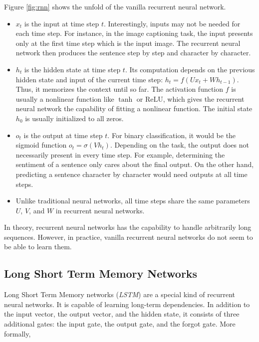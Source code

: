         Figure \ref{fig:rnn} shows the unfold of the vanilla recurrent neural network.

        \begin{itemize}
            \item $x_t$ is the input at time step $t$.
                Interestingly, inputs may not be needed for each time step.
                For instance, in the image captioning task,
                the input presents only at the first time step which is the input image.
                The recurrent neural network then produces the sentence step by step and character by character.
            \item $h_t$ is the hidden state at time step $t$.
                Its computation depends on the previous hidden state and input of the current time step:
                $h_t = f(Ux_t + Wh_{t-1})$.
                Thus, it memorizes the context until so far.
                The activation function $f$ is usually a nonlinear function like $\tanh$ or $\mathrm{ReLU}$,
                which gives the recurrent neural network the capability of fitting a nonlinear function.
                The initial state $h_0$ is usually initialized to all zeros.
            \item $o_t$ is the output at time step $t$.
                For binary classification, it would be the sigmoid function $o_t = \sigma(Vh_t)$.
                Depending on the task, the output does not necessarily present in every time step.
                For example, determining the sentiment of a sentence only cares about the final output.
                On the other hand, predicting a sentence character by character would need outputs at all time steps.
            \item Unlike traditional neural networks,
                all time steps share the same parameters $U$, $V$, and $W$ in recurrent neural networks.
        \end{itemize}

        In theory, recurrent neural networks has the capability to handle arbitrarily long sequences.
        However, in practice, vanilla recurrent neural networks do not seem to be able to learn them.
        \cite{Pascanu2013}

    \subsection{Long Short Term Memory Networks}

        Long Short Term Memory networks (\emph{LSTM}) are a special kind of recurrent neural networks.
        It is capable of learning long-term dependencies.
        In addition to the input vector, the output vector, and the hidden state,
        it consists of three additional gates: the input gate, the output gate, and the forgot gate.
        More formally,

